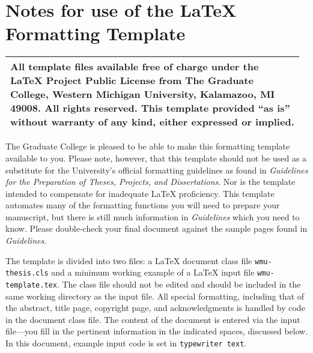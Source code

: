 \documentclass{wmu-thesis}
\begin{document}
\chapter*{Notes for use of the \texorpdfstring{\LaTeX{}\\}{LaTeX} Formatting Template}
\begin{center}
\begin{tabular}{|p{0.97\linewidth}|}
\hline
All template files %
available free of charge under the \LaTeX{} Project Public License from The Graduate College, Western Michigan University, Kalamazoo, MI  49008.  All rights reserved.  %
 This template provided ``as is'' without warranty of any kind, either expressed or implied.\\
\hline
\end{tabular}
\end{center}

The Graduate College is pleased to be able to make this formatting template available to you.  Please note, however, that this template should not be used as a substitute for the University's official formatting guidelines as found in \textit{Guidelines for the Preparation of Theses, Projects, and Dissertations}.  Nor is the template intended to compensate for inadequate \LaTeX{} proficiency.  This template automates many of the formatting functions you will need to prepare your manuscript, but there is still much information in \textit{Guidelines} which you need to know.  Please double-check your final document against the sample pages found in \textit{Guidelines}.

The template is divided into two files: a \LaTeX{} document class file \texttt{wmu-thesis.cls} and a minimum working example of a \LaTeX{} input file \texttt{wmu-template.tex}.  The class file should not be edited and should be included in the same working directory as the input file.  All special formatting, including that of the abstract, title page, copyright page, and acknowledgments is handled by code in the document class file.  The content of the document is entered via the input file---you fill in the pertinent information in the indicated spaces, discussed below.  In this document, example input code is set in \texttt{typewriter text}.  
\end{document}
